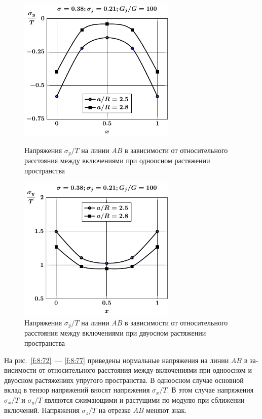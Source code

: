 \begin{russian}
\begin{figure}[h!]
\centering\footnotesize
\parbox[b]{7.5cm}{\centering\includegraphics[width=7.5cm]{inc13-a-d95-g100-t1-sig_y-ab.pdf}
\caption{Напряжения $\sigma_y/T$ на линии  $AB$ в зависимости от относительного расстояния между включениями при одноосном растяжении пространства
\label{f:8:74}}}\hfil\hfil
\parbox[b]{7.5cm}{\centering\includegraphics[width=7.5cm]{inc13-a-d95-g100-t2-sig_y-ab.pdf}
\caption{Напряжения $\sigma_y/T$ на линии  $AB$ в зависимости от относительного расстояния между включениями при двуосном растяжении пространства
\label{f:8:75}}}
\end{figure}

На рис.~\ref{f:8:72}~--- \ref{f:8:77} приведены нормальные напряжения на линии $AB$ в зависимости от относительного расстояния между включениями при одноосном и двуосном растяжениях упругого пространства. В одноосном случае основной вклад в тензор напряжений вносят напряжения $\sigma_x/T$. В этом случае напряжения $\sigma_x/T$ и $\sigma_y/T$ являются сжимающими и растущими по модулю при сближении включений. Напряжения $\sigma_z/T$ на отрезке $AB$ меняют знак.


\end{russian}
